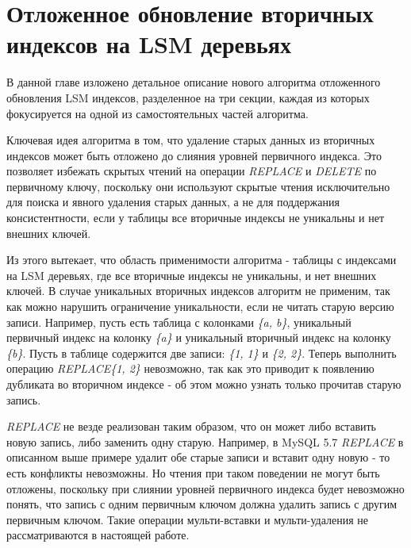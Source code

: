 \documentclass[a4paper,hidelinks,12pt]{article}
\begin{document}
\section{Отложенное обновление вторичных индексов на LSM деревьях}
В данной главе изложено детальное описание нового алгоритма отложенного
обновления LSM индексов, разделенное на три секции, каждая из которых
фокусируется на одной из самостоятельных частей алгоритма.

Ключевая идея алгоритма в том, что удаление старых данных из вторичных индексов
может быть отложено до слияния уровней первичного индекса. Это позволяет
избежать скрытых чтений на операции \textit{REPLACE} и \textit{DELETE} по
первичному ключу, поскольку они используют скрытые чтения исключительно для
поиска и явного удаления старых данных, а не для поддержания консистентности,
если у таблицы все вторичные индексы не уникальны и нет внешних ключей.

Из этого вытекает, что область применимости алгоритма - таблицы с индексами на
LSM деревьях, где все вторичные индексы не уникальны, и нет внешних ключей. В
случае уникальных вторичных индексов алгоритм не применим, так как можно
нарушить ограничение уникальности, если не читать старую версию записи.
Например, пусть есть таблица с колонками \textit{\{a, b\}}, уникальный первичный
индекс на колонку \textit{\{a\}} и уникальный вторичный индекс на колонку
\textit{\{b\}}. Пусть в таблице содержится две записи: \textit{\{1, 1\}} и
\textit{\{2, 2\}}. Теперь выполнить операцию \textit{REPLACE\{1, 2\}} невозможно,
так как это приводит к появлению дубликата во вторичном индексе - об этом можно
узнать только прочитав старую запись.

\textit{REPLACE} не везде реализован таким образом, что он может либо вставить
новую запись, либо заменить одну старую. Например, в MySQL 5.7 \textit{REPLACE}
в описанном выше примере удалит обе старые записи и вставит одну новую - то есть
конфликты невозможны. Но чтения при таком поведении не могут быть отложены,
поскольку при слиянии уровней первичного индекса будет невозможно понять, что
запись с одним первичным ключом должна удалить запись с другим первичным ключом.
Такие операции мульти-вставки и мульти-удаления не рассматриваются в настоящей
работе.
\end{document}
